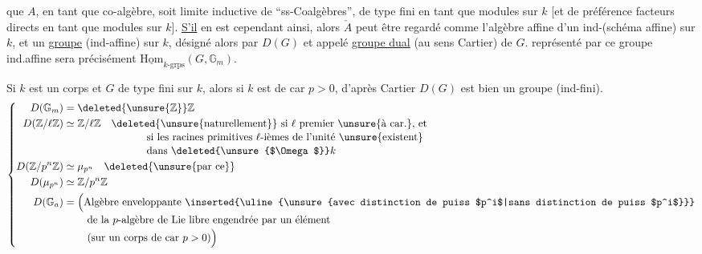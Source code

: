 
 que $A$, en tant que co-algèbre, soit limite inductive de ``ss-Coalgèbres'', de type fini en tant que modules sur $k$   [et de préférence facteurs directs en tant que modules sur $k$]. \uline{S'il} en est cependant ainsi, alors $\check A$ peut être regardé comme l'algèbre affine d'un ind-(schéma affine) sur $k$,   et  \unsure{=} un \uline{groupe} (ind-affine) sur $k$, désigné alors par $D(G)$ et appelé \uline{groupe dual} (au sens Cartier) de $G$.   représenté par ce  groupe ind.affine sera précisément $\underline{\mathrm{Hom}}_{k\text{-grps}}(G,\mathbb G_m)$.

Si  $k$ est  un corps et $G$ de type fini sur $k$, alors si $k$ est de car $p>0$, d'après Cartier $D(G)$ est bien un groupe (ind-fini).
\[
\left\{\begin{aligned}
D(\mathbb G_m)&=\deleted{\unsure{\mathbb Z}}\mathbb Z\\
D(\mathbb Z/\ell\mathbb Z)&\simeq\mathbb Z/\ell\mathbb Z
\quad\text{\deleted{\unsure{naturellement}} si $\ell$ premier \unsure{à car.}, et}\\[-2pt]
&\hspace{28mm}\text{si les racines primitives $\ell$-ièmes de l'unité \unsure{existent}}\\[-2pt]
&\hspace{28mm}\text{dans \deleted{\unsure{$\Omega$}}$k$}\\
D(\mathbb Z/p^n\mathbb Z)&\simeq\mu_{p^n}\quad\text{\deleted{\unsure{par ce}}}\\
D(\mu_{p^n})&\simeq\mathbb Z/p^n\mathbb Z\\
D(\mathbb G_a)&=\Bigl(\text{Algèbre enveloppante \inserted{\uline{\unsure{avec distinction de puiss $p^i$|sans distinction de puiss $p^i$}}}}\\[-2pt]
&\hspace{8mm}\text{de la $p$-algèbre de Lie libre engendrée par un élément}\\[-2pt]
&\hspace{8mm}\text{(sur un corps de car $p>0$)}\Bigr)
\end{aligned}\right.
\]
